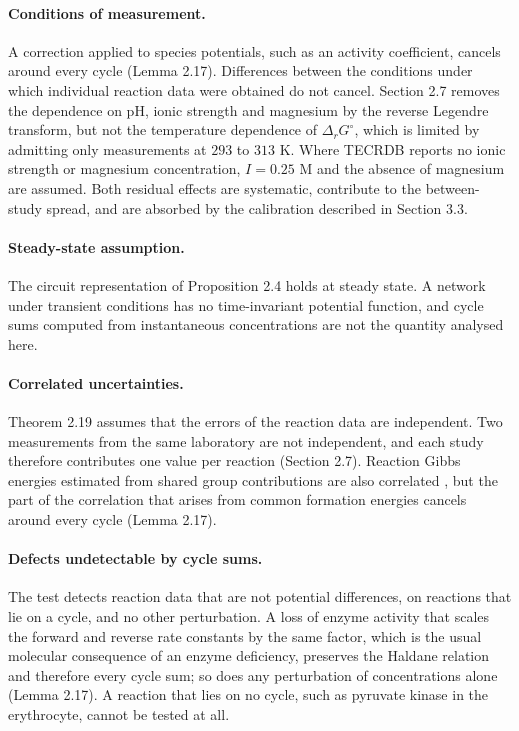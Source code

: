 \documentclass[11pt,a4paper]{article}
\theoremstyle{pstyle}
\theoremstyle{definition}
\theoremstyle{remark}
\begin{document}
\paragraph{Conditions of measurement.} A correction applied to species
potentials, such as an activity coefficient, cancels around every cycle
(Lemma 2.17). Differences between the conditions under
which individual reaction data were obtained do not cancel.
Section 2.7 removes the dependence on pH, ionic strength and
magnesium by the reverse Legendre transform, but not the temperature
dependence of $\Delta_rG^{\circ}$, which is limited by admitting only
measurements at $293$ to $313$ K. Where TECRDB reports no ionic strength
or magnesium concentration, $I=0.25$ M and the absence of magnesium are
assumed. Both residual effects are systematic, contribute to the
between-study spread, and are absorbed by the calibration described in
Section 3.3.

\paragraph{Steady-state assumption.} The circuit representation of
Proposition 2.4 holds at steady state. A network under transient
conditions has no time-invariant potential function, and cycle sums
computed from instantaneous concentrations are not the quantity analysed
here.

\paragraph{Correlated uncertainties.} Theorem 2.19 assumes
that the errors of the reaction data are independent. Two measurements
from the same laboratory are not independent, and each study therefore
contributes one value per reaction (Section 2.7). Reaction Gibbs
energies estimated from shared group contributions are also correlated
\citep{noor2013}, but the part of the correlation that arises from
common formation energies cancels around every cycle
(Lemma 2.17).

\paragraph{Defects undetectable by cycle sums.} The test detects
reaction data that are not potential differences, on reactions that lie
on a cycle, and no other perturbation. A loss of enzyme activity that
scales the forward and reverse rate constants by the same factor, which
is the usual molecular consequence of an enzyme deficiency, preserves
the Haldane relation and therefore every cycle sum; so does any
perturbation of concentrations alone (Lemma 2.17). A
reaction that lies on no cycle, such as pyruvate kinase in the
erythrocyte, cannot be tested at all.
\end{document}
